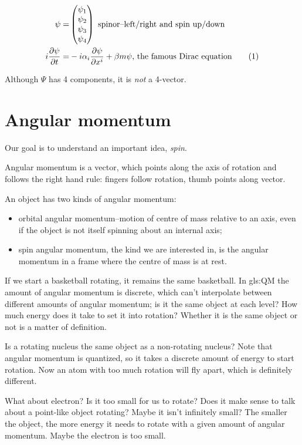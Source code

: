 \documentclass[]{article}
\newcommand\numberthis{\addtocounter{equation}{1}\tag{\theequation}}
\begin{document}
\begin{align*}
	\psi =& \begin{pmatrix}
		\psi_1\\
		\psi_2\\
		\psi_3\\
		\psi_4
	\end{pmatrix} \text{ spinor--left/right and spin up/down}\\
	i \frac{\partial \psi}{\partial t} =& -i \alpha_i \frac{\partial \psi}{\partial x^i} + \beta m \psi \text{, the famous Dirac equation} \numberthis \label{eq:famous:dirac}
\end{align*}

Although $\Psi$ has 4 components, it is \emph{not} a 4-vector.

\section{Angular momentum}

Our goal is to understand an important idea, \emph{spin}.

Angular momentum is a vector, which points along the axis of rotation and follows the right hand rule: fingers follow rotation, thumb points along vector.

An object has two kinds of angular momentum:
\begin{itemize}
	\item orbital angular momentum--motion of centre of mass relative to an axis, even if the object is not itself spinning about an internal axis;
	\item spin angular momentum, the kind we are interested in, is the angular momentum in a frame where the centre of mass is at rest.
\end{itemize}

If we start a basketball rotating, it remains the same basketball. In \glsdesc{gls:QM} the amount of angular momentum is discrete, which can't interpolate between different amounts of angular momentum; is it the same object at each level? How much energy does it take to set it into rotation? Whether it is the same object or not is a matter of definition.

Is a rotating nucleus the same object as a non-rotating nucleus? Note that angular momentum is quantized, so it takes a discrete amount of energy to start rotation. Now an atom with too much rotation will fly apart, which is definitely different. 

What about electron? Is it too small for us to rotate? Does it make sense to talk about a point-like object rotating?  Maybe it isn't infinitely small? The smaller the object, the more energy it needs to rotate with a given amount of angular momentum. Maybe the electron is too small.
\end{document}
